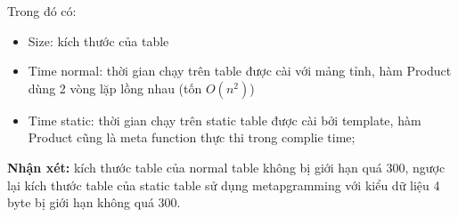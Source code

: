 \noindent Trong đó có:
\begin{itemize}
    \item Size: kích thước của table
    \item Time normal: thời gian chạy trên table được cài với mảng tỉnh, hàm Product dùng 2 vòng lặp lồng nhau (tốn $O(n^2)$)
    \item Time static: thời gian chạy trên static table được cài bởi template, hàm Product cũng là meta function thực thi trong complie time;
\end{itemize}

\textbf{Nhận xét: }kích thước table của normal table không bị giới hạn quá 300, ngược lại kích thước table của static table sử dụng metapgramming với kiểu dữ liệu 4 byte bị giới hạn không quá 300.
